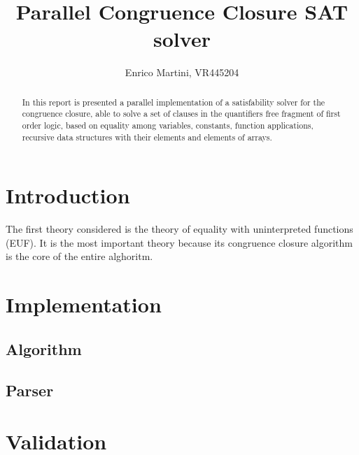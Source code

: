 \documentclass{IEEEtran}
\begin{document}
\title{Parallel Congruence Closure SAT solver}
\author{Enrico Martini, VR445204}
\maketitle
\begin{abstract}
 In this report is presented a parallel implementation of a satisfability solver for the congruence closure, able to solve a set of clauses in the quantifiers free fragment of first order logic, based on equality among variables, constants, function applications, recursive data structures with their elements and elements of arrays.
\end{abstract}
\section{Introduction}
The first theory considered is the theory of equality with uninterpreted functions (EUF). It is the most important theory because its congruence closure algorithm is the core of the entire alghoritm. 
\section{Implementation}


\subsection{Algorithm}


\subsection{Parser}


\section{Validation}
\end{document}
